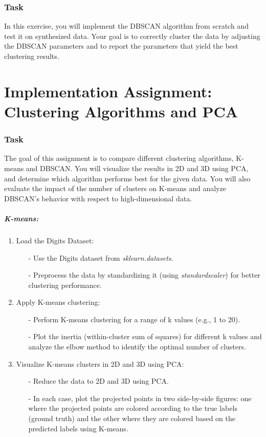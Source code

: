 \documentclass{article}
\begin{document}
		\section*{Task}
		In this exercise, you will implement the DBSCAN algorithm from scratch and test it on synthesized data. Your goal is to correctly cluster the data by adjusting the DBSCAN parameters and to report the parameters that yield the best clustering results.
	\part{Implementation Assignment:\\Clustering Algorithms and PCA}
	\section*{Task}
		The goal of this assignment is to compare different clustering algorithms, K-means and DBSCAN. You will visualize the results in 2D and 3D using PCA, and determine which algorithm performs best for the given data. You will also evaluate the impact of the number of clusters on K-means and analyze DBSCAN's behavior with respect to high-dimensional data.
		\subsubsection*{K-means:}
		\begin{enumerate}
			\item Load the Digits Dataset:
			\begin{itemize}
				\item[-] Use the Digits dataset from \textit{sklearn.datasets}.
				\item[-] Preprocess the data by standardizing it (using \textit{standardscaler}) for better clustering performance.
			\end{itemize}
			\item Apply K-means clustering:
			\begin{itemize}
				\item[-] Perform K-means clustering for a range of k values (e.g., 1 to 20).
				\item[-] Plot the inertia (within-cluster sum of squares) for different k values and analyze the elbow method to identify the optimal number of clusters.
			\end{itemize}
			\item Visualize K-means clusters in 2D and 3D using PCA:
			\begin{itemize}
				\item[-] Reduce the data to 2D and 3D using PCA.
				\item[-] In each case, plot the projected points in two side-by-side figures: one where the projected points are colored according to the true labels (ground truth) and the other where they are colored based on the predicted labels using K-means.
			\end{itemize}
		\end{enumerate}
\end{document}
